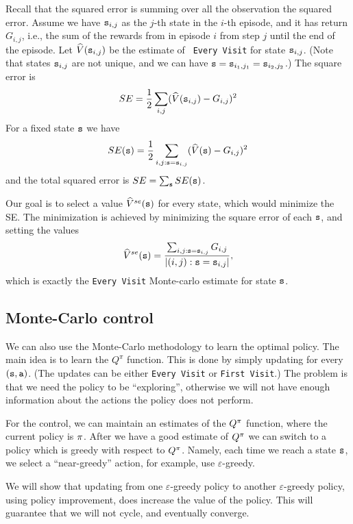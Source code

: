 \begin{advanced}
Recall that the squared error is summing over all the observation
the squared error. Assume we have ${\tt s}_{i,j}$ as the $j$-th state
in the $i$-th episode, and it has return $G_{i,j}$, i.e., the sum of
the rewards from in episode $i$ from step $j$ until the end of the
episode. Let $\widehat{V}({\tt s}_{i,j})$ be the estimate of {\tt
Every Visit} for state ${\tt s}_{i,j}$. (Note that states
${\tt s}_{i,j}$ are not unique, and we can have
${\tt s}={\tt s}_{i_1,j_1}={\tt s}_{i_2,j_2}$.) The square error is
\[
SE=\frac{1}{2}\sum_{i,j} (\widehat{V}({\tt s}_{i,j})-G_{i,j})^2
\]
For a fixed state ${\tt s}$ we have
\[
SE({\tt s})=\frac{1}{2}\sum_{i,j:{\tt s}={\tt s}_{i,j}}
(\widehat{V}({\tt s})-G_{i,j})^2
\]
and the total squared error is $SE=\sum_{\tt s} SE({\tt s})$.

Our goal is to select a value $\widehat{V}^{se}({\tt s})$ for every
state, which would minimize the SE. The minimization is achieved by
minimizing the square error of each ${\tt s}$, and setting the values
\[
\widehat{V}^{se}({\tt s})=\frac{\sum_{i,j:{\tt s}={\tt s}_{i,j}}
G_{i,j}}{|{(i,j):{\tt s}={\tt s}_{i,j}}|},
\]
which is exactly the {\tt Every Visit} Monte-carlo estimate for
state ${\tt s}$.
\end{advanced}

\subsection{Monte-Carlo control}

We can also use the Monte-Carlo methodology to learn the optimal
policy.
%
The main idea is to learn the $Q^\pi$ function. This is done by
simply updating for every $({\tt s},{\tt a})$. (The updates can be
either {\tt Every Visit} or {\tt First Visit}.) The problem is that
we need the policy to be ``exploring'', otherwise we will not have
enough information about the actions the policy does not perform.

For the control, we can maintain an estimates of the $Q^\pi$
function, where the current policy is $\pi$. After we have a
good estimate of $Q^\pi$ we can switch to a policy which is
greedy with respect to $Q^\pi$. Namely, each time we reach a
state ${\tt s}$, we select a ``near-greedy'' action, for example, use
$\varepsilon$-greedy.

We will show that updating from one $\varepsilon$-greedy policy to
another $\varepsilon$-greedy policy, using policy improvement, does
increase the value of the policy. This will guarantee that we will not cycle, and eventually converge.

